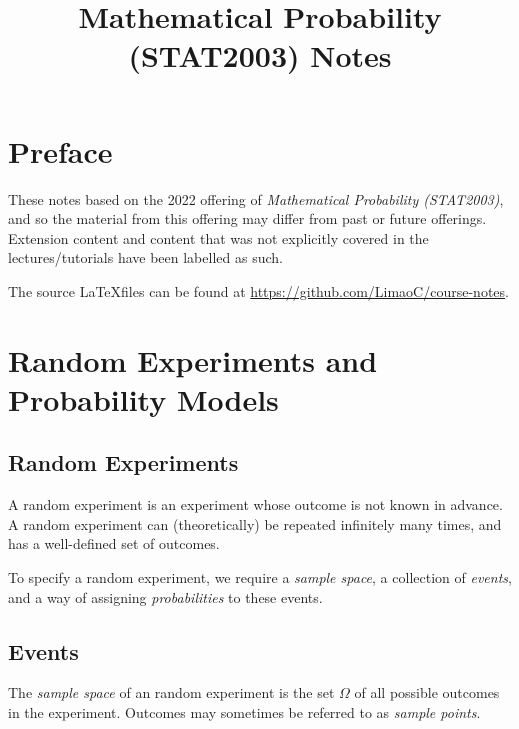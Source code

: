 

\title{Mathematical Probability (STAT2003) Notes}



\begin{titlepage}
    \maketitle
\end{titlepage}

\tableofcontents


\chapter*{Preface}
These notes based on the 2022 offering of \emph{Mathematical Probability (STAT2003)}, and so the material from this offering may differ from past or future offerings. Extension content and content that was not explicitly covered in the lectures/tutorials have been labelled as such.

The source \LaTeX files can be found at \href{https://github.com/LimaoC/course-notes}{https://github.com/LimaoC/course-notes}.

\chapter{Random Experiments and Probability Models}

\section{Random Experiments}\label{random-experiments}
A random experiment is an experiment whose outcome is not known in advance. A random experiment can (theoretically) be repeated infinitely many times, and has a well-defined set of outcomes.

To specify a random experiment, we require a \emph{sample space}, a collection of \emph{events}, and a way of assigning \emph{probabilities} to these events.

\section{Events}
\begin{definition}
    The \emph{sample space} of an random experiment is the set $\Omega$ of all possible outcomes in the experiment. Outcomes may sometimes be referred to as \emph{sample points}.
\end{definition}

